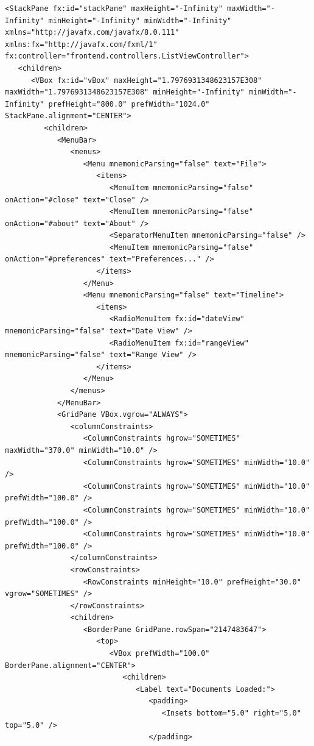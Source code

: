 \begin{lstlisting}
<StackPane fx:id="stackPane" maxHeight="-Infinity" maxWidth="-Infinity" minHeight="-Infinity" minWidth="-Infinity" xmlns="http://javafx.com/javafx/8.0.111" xmlns:fx="http://javafx.com/fxml/1" fx:controller="frontend.controllers.ListViewController">
   <children>
      <VBox fx:id="vBox" maxHeight="1.7976931348623157E308" maxWidth="1.7976931348623157E308" minHeight="-Infinity" minWidth="-Infinity" prefHeight="800.0" prefWidth="1024.0" StackPane.alignment="CENTER">
         <children>
            <MenuBar>
               <menus>
                  <Menu mnemonicParsing="false" text="File">
                     <items>
                        <MenuItem mnemonicParsing="false" onAction="#close" text="Close" />
                        <MenuItem mnemonicParsing="false" onAction="#about" text="About" />
                        <SeparatorMenuItem mnemonicParsing="false" />
                        <MenuItem mnemonicParsing="false" onAction="#preferences" text="Preferences..." />
                     </items>
                  </Menu>
                  <Menu mnemonicParsing="false" text="Timeline">
                     <items>
                        <RadioMenuItem fx:id="dateView" mnemonicParsing="false" text="Date View" />
                        <RadioMenuItem fx:id="rangeView" mnemonicParsing="false" text="Range View" />
                     </items>
                  </Menu>
               </menus>
            </MenuBar>
            <GridPane VBox.vgrow="ALWAYS">
               <columnConstraints>
                  <ColumnConstraints hgrow="SOMETIMES" maxWidth="370.0" minWidth="10.0" />
                  <ColumnConstraints hgrow="SOMETIMES" minWidth="10.0" />
                  <ColumnConstraints hgrow="SOMETIMES" minWidth="10.0" prefWidth="100.0" />
                  <ColumnConstraints hgrow="SOMETIMES" minWidth="10.0" prefWidth="100.0" />
                  <ColumnConstraints hgrow="SOMETIMES" minWidth="10.0" prefWidth="100.0" />
               </columnConstraints>
               <rowConstraints>
                  <RowConstraints minHeight="10.0" prefHeight="30.0" vgrow="SOMETIMES" />
               </rowConstraints>
               <children>
                  <BorderPane GridPane.rowSpan="2147483647">
                     <top>
                        <VBox prefWidth="100.0" BorderPane.alignment="CENTER">
                           <children>
                              <Label text="Documents Loaded:">
                                 <padding>
                                    <Insets bottom="5.0" right="5.0" top="5.0" />
                                 </padding>

\end{lstlisting}
